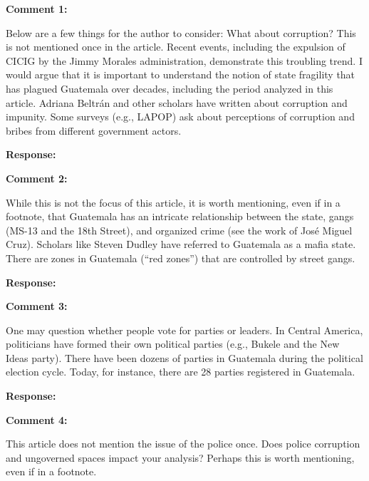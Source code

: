 \documentclass[12pt, a4paper, notitlepage]{article}
\begin{document}
\vspace{15pt}
\noindent\textbf{Comment 1:}
\begin{displayquote}
Below are a few things for the author to consider:
What about corruption? This is not mentioned once in the article. Recent events, including the expulsion of CICIG by the Jimmy Morales administration, demonstrate this troubling trend. I would argue that it is important to understand the notion of state fragility that has plagued Guatemala over decades, including the period analyzed in this article. Adriana Beltrán and other scholars have written about corruption and impunity. Some surveys (e.g., LAPOP) ask about perceptions of corruption and bribes from different government actors.
\end{displayquote}

\noindent\textbf{Response:}

\vspace{15pt}
\noindent\textbf{Comment 2:}
\begin{displayquote}
While this is not the focus of this article, it is worth mentioning, even if in a footnote, that Guatemala has an intricate relationship between the state, gangs (MS-13 and the 18th Street), and organized crime (see the work of José Miguel Cruz). Scholars like Steven Dudley have referred to Guatemala as a mafia state. There are zones in Guatemala (“red zones”) that are controlled by street gangs.
\end{displayquote}

\noindent\textbf{Response:}

\vspace{15pt}
\noindent\textbf{Comment 3:}
\begin{displayquote}
One may question whether people vote for parties or leaders. In Central America, politicians have formed their own political parties (e.g., Bukele and the New Ideas party). There have been dozens of parties in Guatemala during the political election cycle. Today, for instance, there are 28 parties registered in Guatemala.
\end{displayquote}

\noindent\textbf{Response:}

\vspace{15pt}
\noindent\textbf{Comment 4:}
\begin{displayquote}
This article does not mention the issue of the police once. Does police corruption and ungoverned spaces impact your analysis? Perhaps this is worth mentioning, even if in a footnote.
\end{displayquote}
\end{document}
